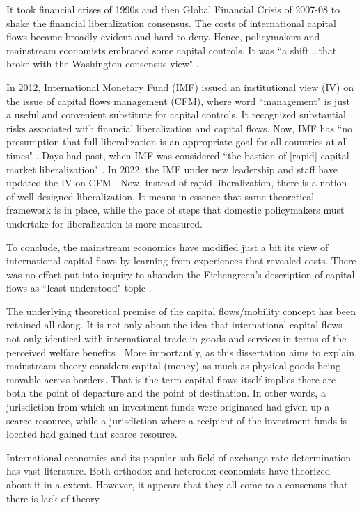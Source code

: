 It took financial crises of 1990s and then Global Financial Crisis of 2007-08 to shake the financial liberalization consensus.
The costs of international capital flows became broadly evident and hard to deny.
Hence, policymakers and mainstream economists embraced some capital controls.
It was ``a shift \dots that broke with the Washington consensus view" \citep[p.~ 276]{acharya2018}.

In 2012, International Monetary Fund (IMF) issued an institutional view (IV) on the issue of capital flows management (CFM), where word ``management" is just a useful and convenient substitute for capital controls.
It recognized substantial risks associated with financial liberalization and capital flows.
Now, IMF has ``no presumption that full liberalization is an appropriate goal for all countries at all times"  \citep{imf2012}.
Days had past, when IMF was considered ``the bastion of [rapid] capital market liberalization"  \citep[p.~154]{kforbes2005}.
In 2022, the IMF under new leadership and staff have updated the IV on CFM  \citep{imf2022}.
Now, instead of rapid liberalization, there is a notion of well-designed liberalization.
It means in essence that same theoretical framework is in place, while the pace of steps that domestic policymakers must undertake for liberalization is more measured.

To conclude, the mainstream economics have modified just a bit its view of international capital flows by learning from experiences that revealed costs.
There was no effort put into inquiry to abandon the Eichengreen's description of capital flows as ``least understood" topic  \citep{eichengreen2001}.

The underlying theoretical premise of the capital flows/mobility concept has been retained all along.
It is not only about the idea that international capital flows not only identical with international trade in goods and services in terms of the perceived welfare benefits \citep{ostry2010,milne2014,koepke2019}. More importantly, as this dissertation aims to explain, mainstream theory considers capital (money) as much as physical goods being movable across borders. That is the term capital flows itself implies there are both the point of departure and the point of destination. In other words, a jurisdiction from which an investment funds were originated had given up a scarce resource, while a jurisdiction where a recipient of the investment funds is located had gained that scarce resource.

International economics and its popular sub-field of exchange rate determination has vast literature. Both orthodox and heterodox economists have theorized about it in a extent. However, it appears that they all come to a consensus that there is lack of theory.

